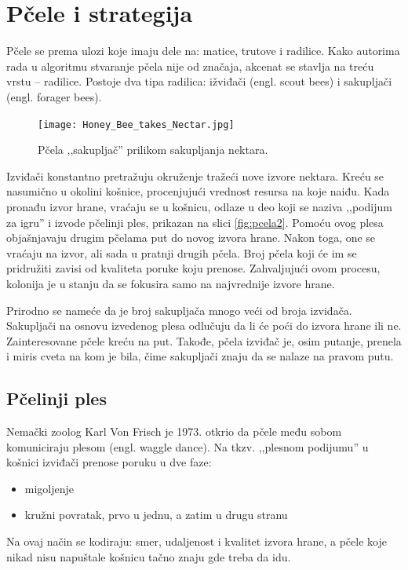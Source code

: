 \documentclass[a4paper]{article}
\begin{document}
{\section{Pčele i strategija}
\label{subsec: ponasanje}
Pčele se prema ulozi koje imaju dele na: matice, trutove i radilice. Kako autorima rada u algoritmu stvaranje pčela nije od značaja, akcenat se stavlja na treću vrstu – radilice. Postoje dva tipa radilica: ižviđači (engl. scout bees) i sakupljači (engl. forager bees). 

\begin{figure}[h!]
\begin{center}
\texttt{[image: Honey\_Bee\_takes\_Nectar.jpg]}
\end{center}
\caption{Pčela ,,sakupljač'' prilikom sakupljanja nektara.}

\label{fig:pcela1}
\end{figure}

Izviđači konstantno pretražuju okruženje tražeći nove izvore nektara. Kreću se nasumično u okolini košnice, procenjujući vrednost resursa na koje naiđu. Kada pronađu izvor hrane, vraćaju se u košnicu, odlaze u deo koji se naziva ,,podijum za igru'' i izvode pčelinji ples, prikazan na slici \ref{fig:pcela2}. Pomoću ovog plesa objašnjavaju drugim pčelama put do novog izvora hrane. Nakon toga, one se vraćaju na izvor, ali sada u pratnji drugih pčela. Broj pčela koji će im se pridružiti zavisi od kvaliteta poruke koju prenose. Zahvaljujući ovom procesu, kolonija je u stanju da se fokusira samo na najvrednije izvore hrane.

Prirodno se nameće da je broj sakupljača mnogo veći od broja izviđača. Sakupljači na osnovu izvedenog plesa odlučuju da li će poći do izvora hrane ili ne. Zainteresovane pčele kreću na put. Takođe, pčela izviđač je, osim putanje, prenela i miris cveta na kom je bila, čime sakupljači znaju da se nalaze na pravom putu.

\subsection{Pčelinji ples}
\label{subsec:pcelinji ples}

Nemački zoolog Karl Von Frisch je 1973. otkrio da pčele među sobom komuniciraju plesom (engl. waggle dance). Na tkzv. ,,plesnom podijumu'' u košnici izviđači prenose poruku u dve faze:
\begin{itemize}%
\setlength{\labelsep}{10pt}
	\item migoljenje
	\item kružni povratak, prvo u jednu, a zatim u drugu stranu
\end{itemize}
Na ovaj način se kodiraju: smer, udaljenost i kvalitet izvora hrane, a pčele koje nikad nisu napuštale košnicu tačno znaju gde treba da idu.

}
\end{document}
